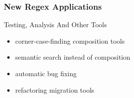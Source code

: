 \begin{frame}
\frametitle{New Regex Applications}

\begin{block}{\begin{Large}Testing, Analysis And Other Tools\end{Large}}
\begin{itemize}
\item corner-case-finding composition tools
\item semantic search instead of composition
\item automatic bug fixing
\item refactoring migration tools
\end{itemize}
\end{block}
\end{frame}




